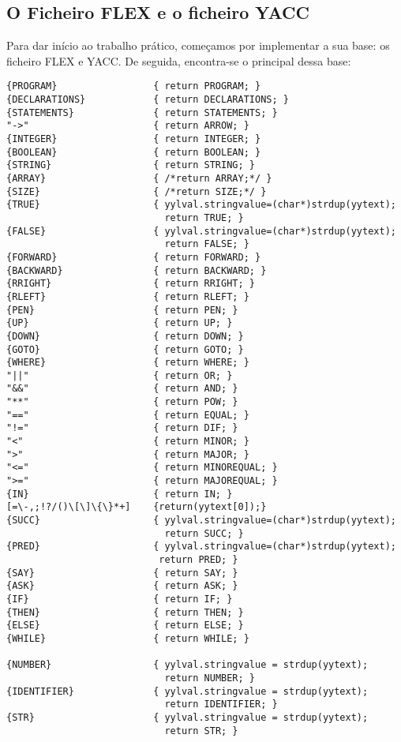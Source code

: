 \documentclass[12pt,a4paper,oneside]{article}
\newenvironment{codefold}{}{}
\begin{document}
\begin{codefold}
  \subsection{O Ficheiro FLEX e o ficheiro YACC}

  \indent Para dar início ao trabalho prático, começamos por implementar a sua base: os ficheiro FLEX e YACC. De seguida, encontra-se o principal dessa base:\\

\begin{verbatim}
{PROGRAM}                 { return PROGRAM; }
{DECLARATIONS}            { return DECLARATIONS; }
{STATEMENTS}              { return STATEMENTS; }
"->"                      { return ARROW; }
{INTEGER}                 { return INTEGER; }
{BOOLEAN}                 { return BOOLEAN; }
{STRING}                  { return STRING; }
{ARRAY}                   { /*return ARRAY;*/ }
{SIZE}                    { /*return SIZE;*/ }
{TRUE}                    { yylval.stringvalue=(char*)strdup(yytext);
                            return TRUE; }
{FALSE}                   { yylval.stringvalue=(char*)strdup(yytext);
                            return FALSE; }
{FORWARD}                 { return FORWARD; }
{BACKWARD}                { return BACKWARD; }
{RRIGHT}                  { return RRIGHT; }
{RLEFT}                   { return RLEFT; }
{PEN}                     { return PEN; }
{UP}                      { return UP; }
{DOWN}                    { return DOWN; }
{GOTO}                    { return GOTO; }
{WHERE}                   { return WHERE; }
"||"                      { return OR; }
"&&"                      { return AND; }
"**"                      { return POW; }
"=="                      { return EQUAL; }
"!="                      { return DIF; }
"<"                       { return MINOR; }
">"                       { return MAJOR; }
"<="                      { return MINOREQUAL; }
">="                      { return MAJOREQUAL; }
{IN}                      { return IN; }
[=\-,;!?/()\[\]\{\}*+]    {return(yytext[0]);}
{SUCC}                    { yylval.stringvalue=(char*)strdup(yytext);
                            return SUCC; }
{PRED}                    { yylval.stringvalue=(char*)strdup(yytext);
                           return PRED; }
{SAY}                     { return SAY; }
{ASK}                     { return ASK; }
{IF}                      { return IF; }
{THEN}                    { return THEN; }
{ELSE}                    { return ELSE; }
{WHILE}                   { return WHILE; }

{NUMBER}                  { yylval.stringvalue = strdup(yytext);
                            return NUMBER; }
{IDENTIFIER}              { yylval.stringvalue = strdup(yytext);
                            return IDENTIFIER; }
{STR}                     { yylval.stringvalue = strdup(yytext);
                            return STR; }


\end{verbatim}
\end{codefold}
\end{document}
